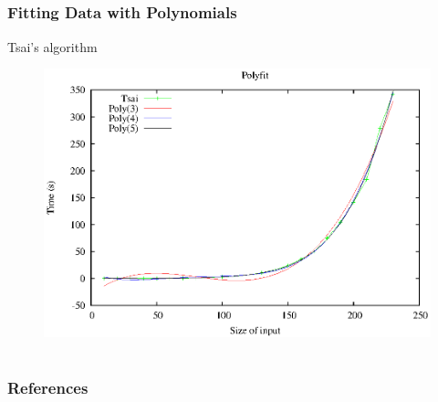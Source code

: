 \documentclass[10pt]{beamer}
\begin{document}
\subsection[Tsai's algorithm]{}
\begin{frame}
  \frametitle{Fitting Data with Polynomials}
Tsai's algorithm
\begin{center}
\begin{figure}[ht]
	\centering
	\includegraphics[scale=0.7]{images/polyfit-tsai.eps}
\end{figure}
\end{center}
\end{frame}

\section[References]{}
\begin{frame}
  \frametitle{References}
\nocite{*}
\begin{spacing}{1}
  
  
\end{spacing}
\end{frame}
\end{document}
